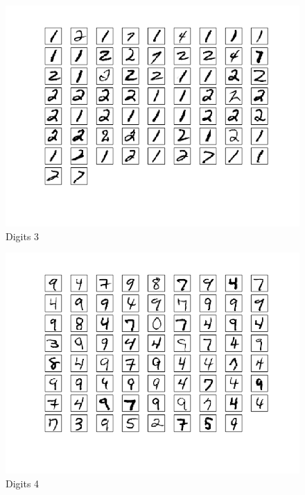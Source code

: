 \documentclass[10pt]{article}
\begin{document}
\begin{figure}
\begin{center}
\includegraphics[scale=0.5]{meansA3}
\caption{Digits 3}
\end{center}
\end{figure}
\begin{figure}
\begin{center}
\includegraphics[scale=0.5]{meansA4}
\caption{Digits 4}
\end{center}
\end{figure}
\end{document}
